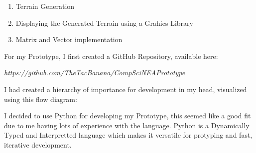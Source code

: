 \begin{flushleft}
\begin{enumerate}
            \vspace{0.2cm}
            \begin{enumerate}
                \item Terrain Generation
                \item Displaying the Generated Terrain using a Grahics Library
                \item Matrix and Vector implementation
            \end{enumerate}
            \vspace{0.2cm}

            For my Prototype, I first created a GitHub Repository, available here: 
            
            \vspace{0.1cm}
            \centerline{\textit{https://github.com/TheTacBanana/CompSciNEAPrototype}}
            \vspace{0.1cm}

            I had created a hierarchy of importance for development in my head, visualized using this flow diagram:

            \begin{center}
            \end{center}

            I decided to use Python for developing my Prototype, this seemed like a good fit due to me 
            having lots of experience with the language. Python is a Dynamically Typed and Interpretted 
            language which makes it versatile for protyping and fast, iterative development.
            

\end{enumerate}
\end{flushleft}
